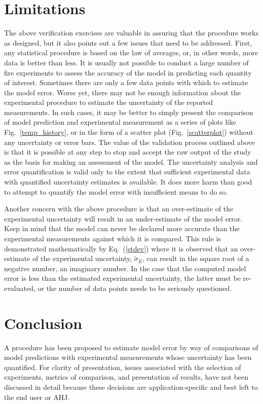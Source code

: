 \section{Limitations}

The above verification exercises are valuable in assuring that the procedure works as designed, but it also points out a few issues that need to be addressed. First, any
statistical procedure is based on the law of averages, or, in other words, more data is better than less. It is usually not possible to conduct a large number of
fire experiments
to assess the accuracy of the model in predicting each quantity of interest. Sometimes there are only a few data points with which to estimate the model error. Worse yet,
there may not be enough information about the experimental procedure to estimate the uncertainty of the reported measurements. In such cases, it may be better
to simply present the comparison of model prediction and experimental measurement as a series of plots like Fig.~\ref{temp_history}, or in the form of a scatter plot
(Fig.~\ref{scatterplot}) without any uncertainty or error bars. The value of the validation process outlined above is that it is
possible at any step to stop and accept the raw output of the study as the basis for making an assessment of the model.
The uncertainty analysis and error quantification is valid only to
the extent that sufficient experimental data with quantified uncertainty estimates is available.
It does more harm than good to attempt to quantify the model error
with insufficient means to do so.

Another concern with the above procedure is that an over-estimate of the experimental uncertainty will result in an under-estimate of the model error. Keep
in mind that the model can never be declared more accurate than the experimental measurements against which it is compared. This rule is demonstrated
mathematically by Eq.~(\ref{stdev}) where it is observed that an over-estimate of the experimental uncertainty, $\widetilde{\sigma}_E$, can result in
the square root of a negative number, an imaginary number. In the case that the computed model error is less than the estimated experimental uncertainty, the
latter must be re-evaluated, or the number of data points needs to be seriously questioned.



\section{Conclusion}

A procedure has been proposed to estimate model error by way of comparisons of model predictions with experimental measurements whose uncertainty has been
quantified. For clarity of presentation, issues associated with the selection of experiments, metrics of comparison, and presentation of results, have not been
discussed in detail because these decisions are application-specific and best left to the end user or AHJ.
